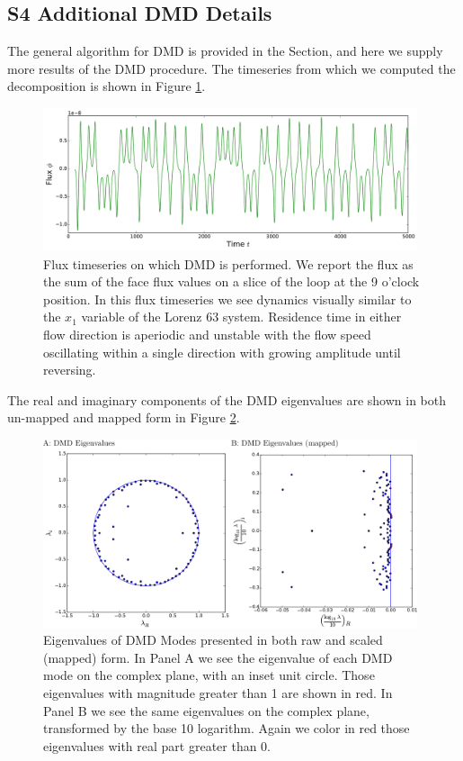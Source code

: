 \documentclass[pre,twocolumn,twoside,byrevtex,superscriptaddress]{revtex4}
\begin{document}
\clearpage
\pagebreak
\subsection*{S4 Additional DMD Details}
\label{S4}

The general algorithm for DMD is provided in the  Section, and here we supply more results of the DMD procedure.
The timeseries from which we computed the decomposition is shown in Figure \ref{fig:DMD-timeseries}.

\begin{figure}[h]
  \centering
  \includegraphics[width=0.98\textwidth]{fig17_DMD-data-timeseries-longer-wide.pdf}
  \caption[]{
    Flux timeseries on which DMD is performed.
    We report the flux as the sum of the face flux values on a slice of the loop at the 9 o'clock position.
    In this flux timeseries we see dynamics visually similar to the $x_1$ variable of the Lorenz 63 system.
    Residence time in either flow direction is aperiodic and unstable with the flow speed oscillating within a single direction with growing amplitude until reversing.
  }
  \label{fig:DMD-timeseries}  
\end{figure}

The real and imaginary components of the DMD eigenvalues are shown in both un-mapped and mapped form in Figure \ref{fig:DMD-eigenvalues}.

\begin{figure}[h]
  \centering
  \includegraphics[width=0.98\textwidth]{fig18_eigenvalues-both-labeled.pdf}
  \caption[]{
    Eigenvalues of DMD Modes presented in both raw and scaled (mapped) form.
    In Panel A we see the eigenvalue of each DMD mode on the complex plane, with an inset unit circle.
    Those eigenvalues with magnitude greater than 1 are shown in red.
    In Panel B we see the same eigenvalues on the complex plane, transformed by the base 10 logarithm.
    Again we color in red those eigenvalues with real part greater than 0.
  }
  \label{fig:DMD-eigenvalues}  
\end{figure}
\end{document}
